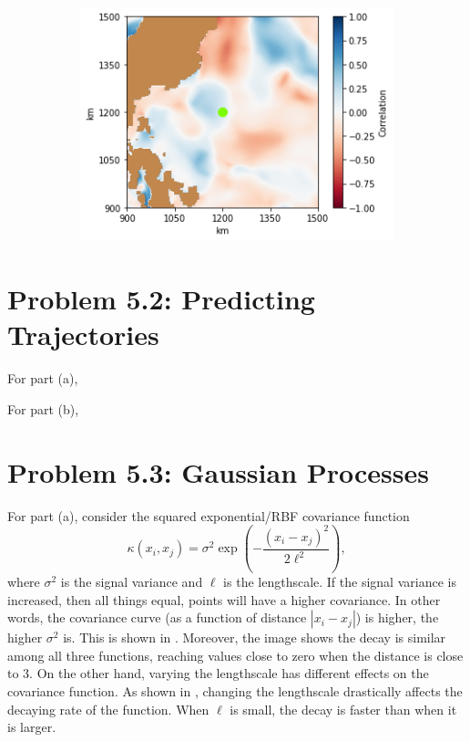 \documentclass[11pt, english]{article}
\begin{document}
\begin{multicols}{2}
\begin{figure}
\begin{subfigure}{0.33\textwidth}
		\includegraphics[width=\textwidth]{coord-2-s}
	\end{subfigure}
\end{figure}

\section*{Problem 5.2: Predicting Trajectories}

For part (a),

For part (b),


\section*{Problem 5.3: Gaussian Processes}

For part (a), consider the squared exponential/RBF covariance function
	$$\kappa(x_{i}, x_{j}) = \sigma^{2}\exp\left(-\frac{(x_{i} - x_{j})^{2}}{2\ell^{2}}\right),$$
where $\sigma^2$ is the signal variance and $\ell$ is the lengthscale. If the signal variance is increased, then all things equal, points will have a higher covariance. In other words, the covariance curve (as a function of distance $|x_{i} - x_{j}|$) is higher, the higher $\sigma^{2}$ is. This is shown in . Moreover, the image shows the decay is similar among all three functions, reaching values close to zero when the distance is close to 3. On the other hand, varying the lengthscale has different effects on the covariance function. As shown in , changing the lengthscale drastically affects the decaying rate of the function. When $\ell$ is small, the decay is faster than when it is larger.


\end{multicols}
\end{document}
